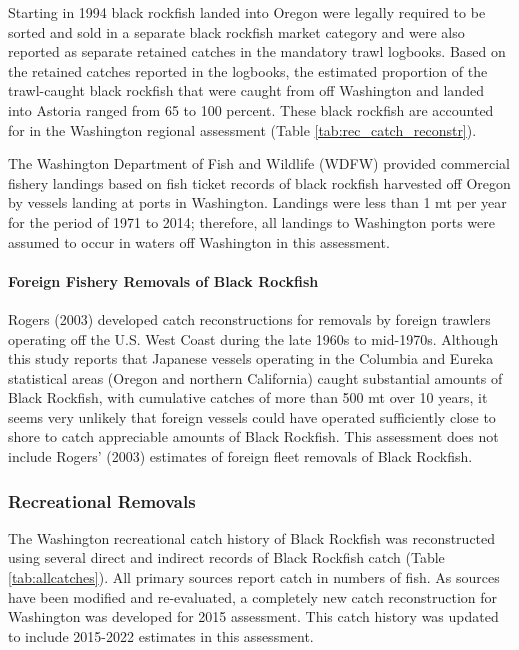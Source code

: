 \documentclass[11pt,
  english,
  letterpaper,
]{article}
\begin{document}
Starting in 1994 black rockfish landed into Oregon were legally required to be sorted and sold in a separate black rockfish market category and were also reported as separate retained catches in the mandatory trawl logbooks. Based on the retained catches reported in the logbooks, the estimated proportion of the trawl-caught black rockfish that were caught from off Washington and landed into Astoria ranged from 65 to 100 percent. These black rockfish are accounted for in the Washington regional assessment (Table \ref{tab:rec_catch_reconstr}).

The Washington Department of Fish and Wildlife (WDFW) provided commercial fishery landings based on fish ticket records of black rockfish harvested off Oregon by vessels landing at ports in Washington. Landings were less than 1 mt per year for the period of 1971 to 2014; therefore, all landings to Washington ports were assumed to occur in waters off Washington in this assessment.

\hypertarget{foreign-fishery-removals-of-black-rockfish}{%
\paragraph{Foreign Fishery Removals of Black Rockfish}\label{foreign-fishery-removals-of-black-rockfish}}

Rogers (2003) developed catch reconstructions for removals by foreign trawlers operating off the U.S. West Coast during the late 1960s to mid-1970s. Although this study reports that Japanese vessels operating in the Columbia and Eureka statistical areas (Oregon and northern California) caught substantial amounts of Black Rockfish, with cumulative catches of more than 500 mt over 10 years, it seems very unlikely that foreign vessels could have operated sufficiently close to shore to catch appreciable amounts of Black Rockfish. This assessment does not include Rogers' (2003) estimates of foreign fleet removals of Black Rockfish.

\hypertarget{recreational-removals}{%
\subsubsection{Recreational Removals}\label{recreational-removals}}

The Washington recreational catch history of Black Rockfish was reconstructed using several direct and indirect records of Black Rockfish catch (Table \ref{tab:allcatches}). All primary sources report catch in numbers of fish. As sources have been modified and re-evaluated, a completely new catch reconstruction for Washington was developed for 2015 assessment. This catch history was updated to include 2015-2022 estimates in this assessment.
\end{document}

